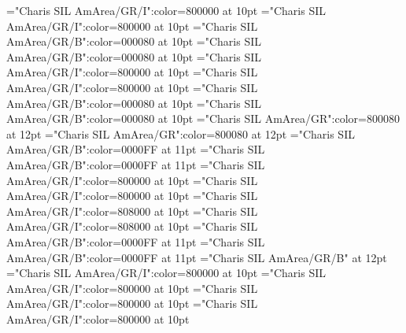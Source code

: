 \documentclass[a4paper,twoside]{article}
\begin{document}
\font\spanesabbreviationvariantentrytypevariantentrytypesvariantformentrybackrefsbentry="Charis SIL AmArea/GR/I":color=800000 at 10pt
\font\spanabbreviationvariantentrytypevariantentrytypesvariantformentrybackrefsbentry="Charis SIL AmArea/GR/I":color=800000 at 10pt
\font\spanmxbheadwordvariantformentrybackrefbvariantformentrybackrefsbentry="Charis SIL AmArea/GR/B":color=000080 at 10pt
\font\spanheadwordvariantformentrybackrefbvariantformentrybackrefsbentry="Charis SIL AmArea/GR/B":color=000080 at 10pt
\font\spanesownertypeabbreviationminimallexreferenceminimallexreferencesentry="Charis SIL AmArea/GR/I":color=800000 at 10pt
\font\spanownertypeabbreviationminimallexreferenceminimallexreferencesentry="Charis SIL AmArea/GR/I":color=800000 at 10pt
\font\spanmxbheadwordconfigtargetconfigtargetsminimallexreferenceminimallexreferencesentry="Charis SIL AmArea/GR/B":color=000080 at 10pt
\font\spanheadwordconfigtargetconfigtargetsminimallexreferenceminimallexreferencesentry="Charis SIL AmArea/GR/B":color=000080 at 10pt
\font\spanesliteralmeaningentry="Charis SIL AmArea/GR":color=800080 at 12pt
\font\spanliteralmeaningentry="Charis SIL AmArea/GR":color=800080 at 12pt
\font\spanmxbheadwordvisiblecomplexformbackrefvisiblecomplexformbackrefsentry="Charis SIL AmArea/GR/B":color=0000FF at 11pt
\font\spanheadwordvisiblecomplexformbackrefvisiblecomplexformbackrefsentry="Charis SIL AmArea/GR/B":color=0000FF at 11pt
\font\spanespartofspeechmorphosyntaxanalysesvisiblecomplexformbackrefsentry="Charis SIL AmArea/GR/I":color=800000 at 10pt
\font\spanpartofspeechmorphosyntaxanalysesvisiblecomplexformbackrefsentry="Charis SIL AmArea/GR/I":color=800000 at 10pt
\font\spanessummaryvisiblecomplexformbackrefsentry="Charis SIL AmArea/GR/I":color=808000 at 10pt
\font\spansummaryvisiblecomplexformbackrefsentry="Charis SIL AmArea/GR/I":color=808000 at 10pt
\font\spanmxbheadwordmainentrycomplex="Charis SIL AmArea/GR/B":color=0000FF at 11pt
\font\spanheadwordmainentrycomplex="Charis SIL AmArea/GR/B":color=0000FF at 11pt
\font\sensenumbersensecontentsensesmainentrycomplex="Charis SIL AmArea/GR/B" at 12pt
\font\spanespartofspeechmorphosyntaxanalysissharedgrammaticalinfosensesmainentrycomplex="Charis SIL AmArea/GR/I":color=800000 at 10pt
\font\spanpartofspeechmorphosyntaxanalysissharedgrammaticalinfosensesmainentrycomplex="Charis SIL AmArea/GR/I":color=800000 at 10pt
\font\spanespartofspeechmorphosyntaxanalysissensesensecontentsensesmainentrycomplex="Charis SIL AmArea/GR/I":color=800000 at 10pt
\font\spanpartofspeechmorphosyntaxanalysissensesensecontentsensesmainentrycomplex="Charis SIL AmArea/GR/I":color=800000 at 10pt
\end{document}
